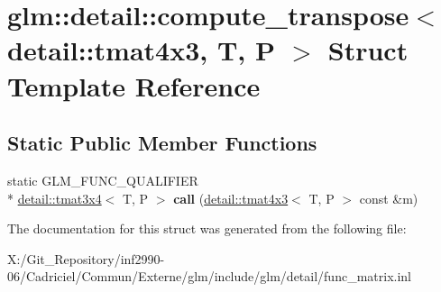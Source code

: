 \hypertarget{structglm_1_1detail_1_1compute__transpose_3_01detail_1_1tmat4x3_00_01_t_00_01_p_01_4}{\section{glm\-:\-:detail\-:\-:compute\-\_\-transpose$<$ detail\-:\-:tmat4x3, T, P $>$ Struct Template Reference}
\label{structglm_1_1detail_1_1compute__transpose_3_01detail_1_1tmat4x3_00_01_t_00_01_p_01_4}
}
\subsection*{Static Public Member Functions}
\begin{DoxyCompactItemize}
\item 
\hypertarget{structglm_1_1detail_1_1compute__transpose_3_01detail_1_1tmat4x3_00_01_t_00_01_p_01_4_aba1245556b2c86727dfb37d64f6a9b9a}{static G\-L\-M\-\_\-\-F\-U\-N\-C\-\_\-\-Q\-U\-A\-L\-I\-F\-I\-E\-R \\*
\hyperlink{structglm_1_1detail_1_1tmat3x4}{detail\-::tmat3x4}$<$ T, P $>$ {\bfseries call} (\hyperlink{structglm_1_1detail_1_1tmat4x3}{detail\-::tmat4x3}$<$ T, P $>$ const \&m)}\label{structglm_1_1detail_1_1compute__transpose_3_01detail_1_1tmat4x3_00_01_t_00_01_p_01_4_aba1245556b2c86727dfb37d64f6a9b9a}

\end{DoxyCompactItemize}


The documentation for this struct was generated from the following file\-:\begin{DoxyCompactItemize}
\item 
X\-:/\-Git\-\_\-\-Repository/inf2990-\/06/\-Cadriciel/\-Commun/\-Externe/glm/include/glm/detail/func\-\_\-matrix.\-inl\end{DoxyCompactItemize}
